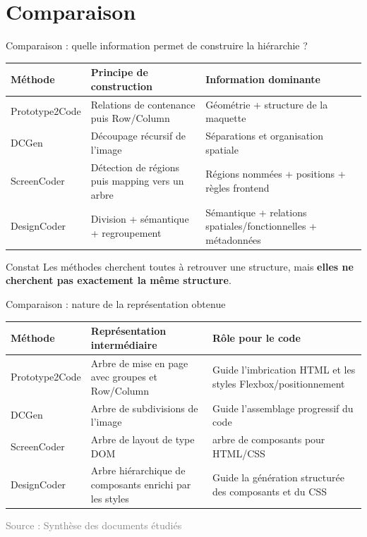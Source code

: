 \documentclass[aspectratio=169,11pt]{beamer}
\newcommand{\source}[1]{\scriptsize\textcolor{gray}{Source : #1}}
\begin{document}
\section{Comparaison}

\begin{frame}{Comparaison : quelle information permet de construire la hiérarchie ?}
\scriptsize
\begin{tabularx}{\textwidth}{>{\raggedright\arraybackslash}p{2.6cm} X X}
\toprule
\textbf{Méthode} & \textbf{Principe de construction} & \textbf{Information dominante}\\
\midrule
Prototype2Code &
Relations de contenance puis Row/Column &
Géométrie + structure de la maquette\\
DCGen &
Découpage récursif de l'image &
Séparations et organisation spatiale\\
ScreenCoder &
Détection de régions puis mapping vers un arbre &
Régions nommées + positions + règles frontend\\
DesignCoder &
Division + sémantique + regroupement &
Sémantique + relations spatiales/fonctionnelles + métadonnées\\
\bottomrule
\end{tabularx}

\vspace{0.35cm}
\begin{block}{Constat}
Les méthodes cherchent toutes à retrouver une structure, mais
\textbf{elles ne cherchent pas exactement la même structure}.
\end{block}
\end{frame}

\begin{frame}{Comparaison : nature de la représentation obtenue}
\scriptsize
\begin{tabularx}{\textwidth}{>{\raggedright\arraybackslash}p{2.6cm} X X}
\toprule
\textbf{Méthode} & \textbf{Représentation intermédiaire} & \textbf{Rôle pour le code}\\
\midrule
Prototype2Code &
Arbre de mise en page avec groupes et Row/Column &
Guide l'imbrication HTML et les styles Flexbox/positionnement\\
DCGen &
Arbre de subdivisions de l'image &
Guide l'assemblage progressif du code\\
ScreenCoder &
Arbre de layout de type DOM &
arbre de composants pour HTML/CSS\\
DesignCoder &
Arbre hiérarchique de composants enrichi par les styles &
Guide la génération structurée des composants et du CSS\\
\bottomrule
\end{tabularx}

\vspace{0.3cm}
\source{Synthèse des documents étudiés}
\end{frame}
\end{document}
